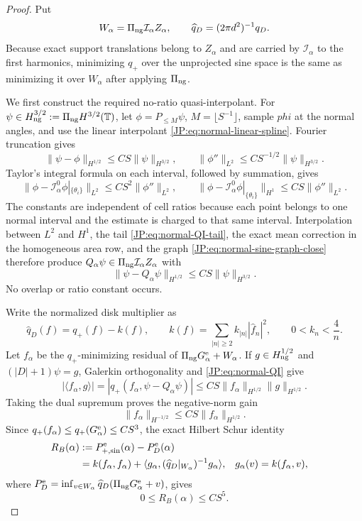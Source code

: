 \begin{proof}
Put
\[
 W_\alpha=\Pi_{\rm ng}\mathcal I_\alpha Z_\alpha,
 \qquad
 \widehat q_D=(2\pi d^2)^{-1}q_D.
\]
Because exact support translations belong to $Z_\alpha$ and are carried by
$\mathcal I_\alpha$ to the first harmonics, minimizing $q_+$ over the
unprojected sine space is the same as minimizing it over $W_\alpha$ after
applying $\Pi_{\rm ng}$.

We first construct the required no-ratio quasi-interpolant.  For
$\psi\in H_{\rm ng}^{3/2}:=\Pi_{\rm ng}H^{3/2}(\mathbb T)$, let
$\phi=P_{\le M}\psi$, $M=\lfloor S^{-1}\rfloor$, sample $phi$ at the
normal angles, and use the linear interpolant
\eqref{JP:eq:normal-linear-spline}.  Fourier truncation gives
\begin{equation}\label{JP:eq:normal-QI-tail}
 \|\psi-\phi\|_{H^{1/2}}\le CS\|\psi\|_{H^{3/2}},
 \qquad
 \|\phi''\|_{L^2}\le CS^{-1/2}\|\psi\|_{H^{3/2}}.
\end{equation}
Taylor's integral formula on each interval, followed by summation, gives
\[
 \|\phi-\mathcal I_\alpha^0\phi|_{\{\theta_i\}}\|_{L^2}
 \le CS^2\|\phi''\|_{L^2},\qquad
 \|\phi-\mathcal I_\alpha^0\phi|_{\{\theta_i\}}\|_{H^1}
 \le CS\|\phi''\|_{L^2}.
\]
The constants are independent of cell ratios because each point belongs to
one normal interval and the estimate is charged to that same interval.
Interpolation between $L^2$ and $H^1$, the tail
\eqref{JP:eq:normal-QI-tail}, the exact mean correction in the homogeneous
area row, and the graph \eqref{JP:eq:normal-sine-graph-close} therefore
produce
$Q_\alpha\psi\in\Pi_{\rm ng}\mathcal I_\alpha Z_\alpha$ with
\begin{equation}\label{JP:eq:normal-QI}
 \|\psi-Q_\alpha\psi\|_{H^{1/2}}
 \le CS\|\psi\|_{H^{3/2}}.
\end{equation}
No overlap or ratio constant occurs.

Write the normalized disk multiplier as
\[
 \widehat q_D(f)
 =q_+(f)-k(f),\qquad
 k(f)=\sum_{|n|\ge2}k_{|n|}|\widehat f_n|^2,
 \qquad 0<k_n<\frac4n.
\]
Let $f_\alpha$ be the $q_+$-minimizing residual of
$\Pi_{\rm ng}G_\alpha^{\rm e}+W_\alpha$.  If
$g\in H_{\rm ng}^{1/2}$ and $(|D|+1)\psi=g$, Galerkin orthogonality and
\eqref{JP:eq:normal-QI} give
\[
 |\langle f_\alpha,g\rangle|
 =|q_+(f_\alpha,\psi-Q_\alpha\psi)|
 \le CS\|f_\alpha\|_{H^{1/2}}\|g\|_{H^{1/2}}.
\]
Taking the dual supremum proves the negative-norm gain
\[
 \|f_\alpha\|_{H^{-1/2}}
 \le CS\|f_\alpha\|_{H^{1/2}}.
\]
Since $q_+(f_\alpha)\le q_+(G_\alpha^{\rm e})\le CS^3$, the exact
Hilbert Schur identity
\begin{align*}
 R_B(\alpha)&:=P_{+,\sin}^{\rm e}(\alpha)-P_D^{\rm e}(\alpha)\\
 &=k(f_\alpha,f_\alpha)
  +\langle g_\alpha,
     (\widehat q_D|_{W_\alpha})^{-1}g_\alpha\rangle,
 &g_\alpha(v)&=k(f_\alpha,v),
\end{align*}
where
$P_D^{\rm e}=\inf_{v\in W_\alpha}\widehat q_D
(\Pi_{\rm ng}G_\alpha^{\rm e}+v)$, gives
\begin{equation}\label{JP:eq:normal-bessel-absolute}
 0\le R_B(\alpha)\le CS^5.
\end{equation}


\end{proof}

